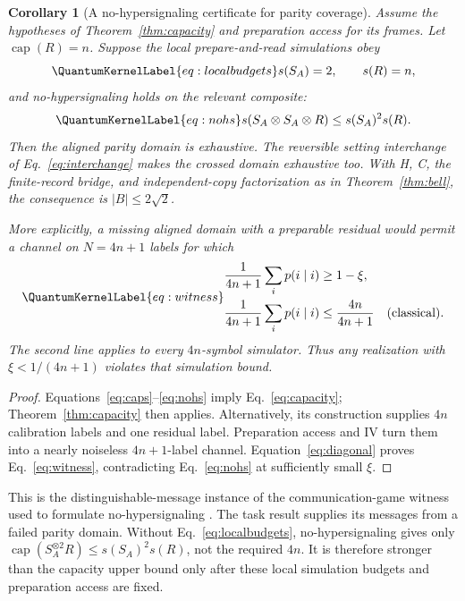 \documentclass[a4paper,11pt,twocolumn,unpublished]{quantumarticle}
\let\label\QuantumKernelLabel
\newtheorem{corollary}{Corollary}[section]
\DeclareMathOperator{\capn}{cap}
\begin{document}
\begin{corollary}[A no-hypersignaling certificate for parity coverage]\label{cor:hs}
Assume the hypotheses of Theorem~\ref{thm:capacity} and preparation access for its frames. Let $\capn(R)=n$. Suppose the local prepare-and-read simulations obey
\begin{equation}\label{eq:localbudgets}
 s(S_A)=2,\qquad s(R)=n,
\end{equation}
and no-hypersignaling holds on the relevant composite:
\begin{equation}\label{eq:nohs}
 s(S_A\otimes S_A\otimes R)\leq s(S_A)^2s(R).
\end{equation}
Then the aligned parity domain is exhaustive. The reversible setting interchange of Eq.~\eqref{eq:interchange} makes the crossed domain exhaustive too. With H, C, the finite-record bridge, and independent-copy factorization as in Theorem~\ref{thm:bell}, the consequence is $|B|\leq2\sqrt2$.

More explicitly, a missing aligned domain with a preparable residual would permit a channel on $N=4n+1$ labels for which
\begin{equation}\label{eq:witness}
\begin{aligned}
 \frac1{4n+1}\sum_i p(i\mid i)&\geq1-\xi,\\
 \frac1{4n+1}\sum_i p(i\mid i)&\leq\frac{4n}{4n+1}\quad\text{(classical)}.
\end{aligned}
\end{equation}
The second line applies to every $4n$-symbol simulator. Thus any realization with $\xi<1/(4n+1)$ violates that simulation bound.
\end{corollary}
\begin{proof}
Equations~\eqref{eq:caps}--\eqref{eq:nohs} imply Eq.~\eqref{eq:capacity}; Theorem~\ref{thm:capacity} then applies. Alternatively, its construction supplies $4n$ calibration labels and one residual label. Preparation access and IV turn them into a nearly noiseless $4n+1$-label channel. Equation~\eqref{eq:diagonal} proves Eq.~\eqref{eq:witness}, contradicting Eq.~\eqref{eq:nohs} at sufficiently small $\xi$.
\end{proof}

This is the distinguishable-message instance of the communication-game witness used to formulate no-hypersignaling \cite[Eq.~(3)]{hs}. The task result supplies its messages from a failed parity domain. Without Eq.~\eqref{eq:localbudgets}, no-hypersignaling gives only $\capn(S_A^{\otimes2}R)\leq s(S_A)^2s(R)$, not the required $4n$. It is therefore stronger than the capacity upper bound only after these local simulation budgets and preparation access are fixed.
\end{document}

